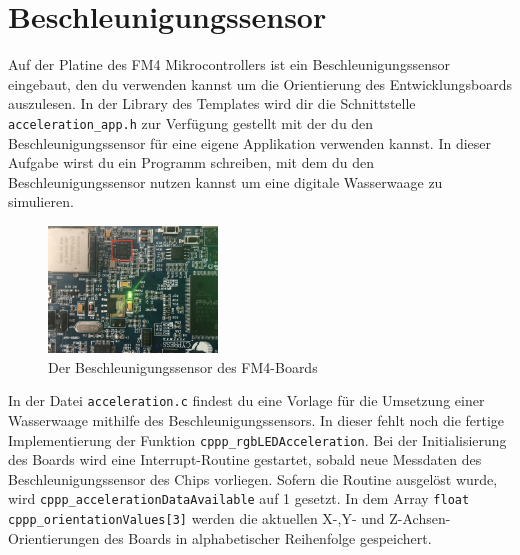 \section{\ExercisePrefixEmbeddedC Beschleunigungssensor \optional}

Auf der Platine des FM4 Mikrocontrollers ist ein Beschleunigungssensor eingebaut, den du verwenden kannst um die Orientierung des Entwicklungsboards auszulesen. In der Library des Templates wird dir die Schnittstelle \lstinline|acceleration_app.h| zur Verfügung gestellt mit der du den Beschleunigungssensor für eine eigene Applikation verwenden kannst. In dieser Aufgabe wirst du ein Programm schreiben, mit dem du den Beschleunigungssensor nutzen kannst um eine digitale Wasserwaage zu simulieren. 
\begin{figure}[!htb]
	\centering
	\includegraphics[width=0.4\textwidth]{./05_c/figures/kxcjk1013.jpg}
	\caption{Der Beschleunigungssensor des FM4-Boards}
	\label{fig:accelerometer}
\end{figure} 

In der Datei \lstinline|acceleration.c| findest du eine Vorlage für die Umsetzung einer Wasserwaage mithilfe des Beschleunigungssensors. In dieser fehlt noch die fertige Implementierung der Funktion \lstinline|cppp_rgbLEDAcceleration|. Bei der Initialisierung des Boards wird eine Interrupt-Routine gestartet, sobald neue Messdaten des Beschleunigungssensor des Chips vorliegen. Sofern die Routine ausgelöst wurde, wird \lstinline|cppp_accelerationDataAvailable| auf 1 gesetzt.  
In dem Array \lstinline|float cppp_orientationValues[3]| werden die aktuellen X-,Y- und Z-Achsen-Orientierungen des Boards in alphabetischer Reihenfolge gespeichert. 

